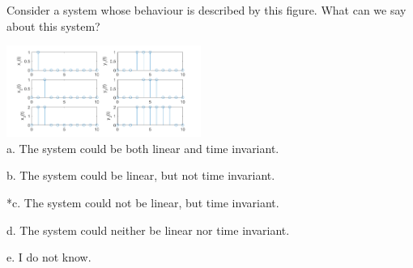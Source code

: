 
Consider a system whose behaviour is described by this figure.  What can we say about this system?

\includegraphics[width=2.5in]{../../Images/LTISystemsQ4.png}\\

a. The system could be both linear and time invariant.

b. The system could be linear, but not time invariant.

*c. The system could not be linear, but time invariant.

d. The system could neither be linear nor time invariant.

e. I do not know.\\
